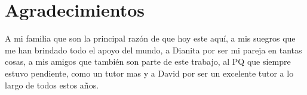\chapter*{Agradecimientos}\label{chapter:thanks}

A mi familia que son la principal razón de que hoy este aquí, a mis suegros que me han brindado todo el apoyo del mundo, a Dianita por ser mi pareja en tantas cosas, a mis amigos que también son parte de este trabajo, al PQ que siempre estuvo pendiente, como un tutor mas y a David por ser un excelente tutor a lo largo de todos estos años.
